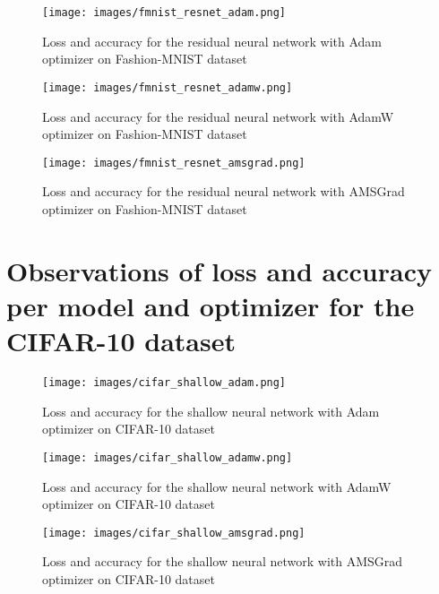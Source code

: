 \documentclass{article} %
\begin{document}
\begin{figure}[h]
\begin{center}
\texttt{[image: images/fmnist\_resnet\_adam.png]}
\end{center}
\caption{Loss and accuracy for the residual neural network with Adam optimizer on Fashion-MNIST dataset}
\end{figure}

\begin{figure}[h]
\begin{center}
\texttt{[image: images/fmnist\_resnet\_adamw.png]}
\end{center}
\caption{Loss and accuracy for the residual neural network with AdamW optimizer on Fashion-MNIST dataset}
\end{figure}

\begin{figure}[h]
\begin{center}
\texttt{[image: images/fmnist\_resnet\_amsgrad.png]}
\end{center}
\caption{Loss and accuracy for the residual neural network with AMSGrad optimizer on Fashion-MNIST dataset}
\end{figure}

\clearpage
\section{Observations of loss and accuracy per model and optimizer for the CIFAR-10 dataset}

\begin{figure}[h]
\begin{center}
\texttt{[image: images/cifar\_shallow\_adam.png]}
\end{center}
\caption{Loss and accuracy for the shallow neural network with Adam optimizer on CIFAR-10 dataset}
\end{figure}

\begin{figure}[h]
\begin{center}
\texttt{[image: images/cifar\_shallow\_adamw.png]}
\end{center}
\caption{Loss and accuracy for the shallow neural network with AdamW optimizer on CIFAR-10 dataset}
\end{figure}

\begin{figure}[h]
\begin{center}
\texttt{[image: images/cifar\_shallow\_amsgrad.png]}
\end{center}
\caption{Loss and accuracy for the shallow neural network with AMSGrad optimizer on CIFAR-10 dataset}
\end{figure}
\end{document}
